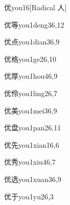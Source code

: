 \begin{verbete}{优}{you1}{6}[Radical 人]
\end{verbete}

\begin{verbete}{优等}{you1deng3}{6,12}
\end{verbete}

\begin{verbete}{优点}{you1dian3}{6,9}
\end{verbete}

\begin{verbete}{优格}{you1ge2}{6,10}
\end{verbete}

\begin{verbete}{优厚}{you1hou4}{6,9}
\end{verbete}

\begin{verbete}{优伶}{you1ling2}{6,7}
\end{verbete}

\begin{verbete}{优美}{you1mei3}{6,9}
\end{verbete}

\begin{verbete}{优盘}{you1pan2}{6,11}
\end{verbete}

\begin{verbete}{优先}{you1xian1}{6,6}
\end{verbete}

\begin{verbete}{优秀}{you1xiu4}{6,7}
\end{verbete}

\begin{verbete}{优选}{you1xuan3}{6,9}
\end{verbete}

\begin{verbete}{优于}{you1yu2}{6,3}
\end{verbete}

